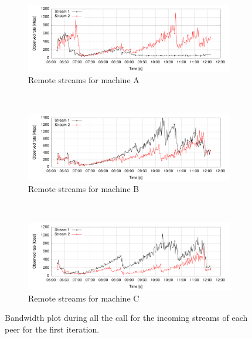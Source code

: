 \begin{figure}[h]
        \centering
        \begin{subfigure}[b]{0.5\textwidth}
                \centering
                \includegraphics[width=\textwidth]{./figures/peer1_three_calls_bw.pdf}
                \caption{Remote streams for machine A}
                \label{fig:three_mesh_A}
        \end{subfigure}%
        ~ %
        \begin{subfigure}[b]{0.5\textwidth}
                \centering
                \includegraphics[width=\textwidth]{./figures/peer2_three_calls_bw.pdf}
                \caption{Remote streams for machine B}
                \label{fig:three_mesh_B}
        \end{subfigure}        
        ~ %
        \begin{subfigure}[b]{0.5\textwidth}
                \centering
                \includegraphics[width=\textwidth]{./figures/peer3_three_calls_bw.pdf}
                \caption{Remote streams for machine C}
                \label{fig:three_mesh_C}
        \end{subfigure}
        \caption[Bandwidth plot during all the call for the incoming streams of each peer for the first iteration]{Bandwidth plot during all the call for the incoming streams of each peer for the first iteration.}
        \label{fig:three_mesh}
\end{figure}

